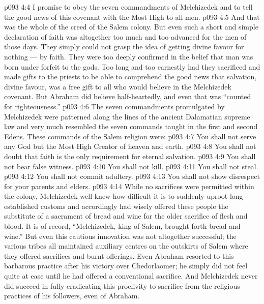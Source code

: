 \vs p093 4:4 \bibnobreakspace I promise to obey the seven commandments of Melchizedek and to tell the good news of this covenant with the Most High to all men.
\vs p093 4:5 \pc And that was the whole of the creed of the Salem colony. But even such a short and simple declaration of faith was altogether too much and too advanced for the men of those days. They simply could not grasp the idea of getting divine favour for nothing --- by faith. They were too deeply confirmed in the belief that man was born under forfeit to the gods. Too long and too earnestly had they sacrificed and made gifts to the priests to be able to comprehend the good news that salvation, divine favour, was a free gift to all who would believe in the Melchizedek covenant. But Abraham did believe half\hyp{}heartedly, and even that was “counted for righteousness.”
\vs p093 4:6 \pc The seven commandments promulgated by Melchizedek were patterned along the lines of the ancient Dalamatian supreme law and very much resembled the seven commands taught in the first and second Edens. These commands of the Salem religion were:
\vs p093 4:7 \bibnobreakspace You shall not serve any God but the Most High Creator of heaven and earth.
\vs p093 4:8 \bibnobreakspace You shall not doubt that faith is the only requirement for eternal salvation.
\vs p093 4:9 \bibnobreakspace You shall not bear false witness.
\vs p093 4:10 \bibnobreakspace You shall not kill.
\vs p093 4:11 \bibnobreakspace You shall not steal.
\vs p093 4:12 \bibnobreakspace You shall not commit adultery.
\vs p093 4:13 \bibnobreakspace You shall not show disrespect for your parents and elders.
\vs p093 4:14 \pc While no sacrifices were permitted within the colony, Melchizedek well knew how difficult it is to suddenly uproot long\hyp{}established customs and accordingly had wisely offered these people the substitute of a sacrament of bread and wine for the older sacrifice of flesh and blood. It is of record, “Melchizedek, king of Salem, brought forth bread and wine.” But even this cautious innovation was not altogether successful; the various tribes all maintained auxiliary centres on the outskirts of Salem where they offered sacrifices and burnt offerings. Even Abraham resorted to this barbarous practice after his victory over Chedorlaomer; he simply did not feel quite at ease until he had offered a conventional sacrifice. And Melchizedek never did succeed in fully eradicating this proclivity to sacrifice from the religious practices of his followers, even of Abraham.
